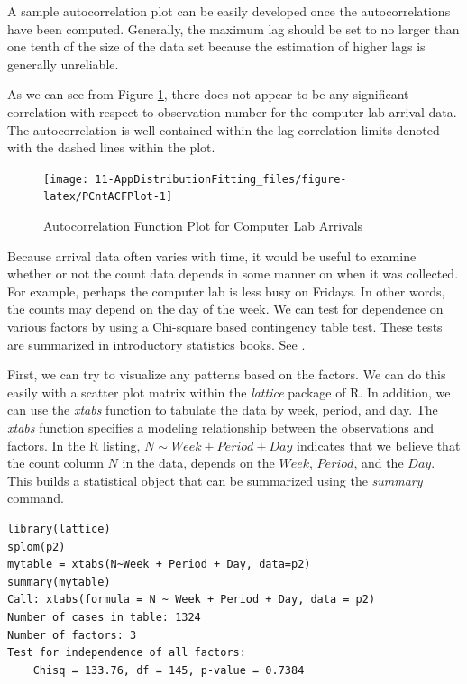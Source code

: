 \documentclass[
]{book}
\theoremstyle{definition}
\theoremstyle{definition}
\theoremstyle{definition}
\theoremstyle{definition}
\theoremstyle{remark}
\begin{document}
A sample autocorrelation plot can be easily developed once the
autocorrelations have been computed. Generally, the maximum lag should
be set to no larger than one tenth of the size of the data set because
the estimation of higher lags is generally unreliable.

As we can see from Figure \ref{fig:PCntACFPlot}, there does not appear to be any significant correlation with respect to observation number for the computer lab arrival data. The autocorrelation is well-contained within the lag correlation limits denoted with the dashed lines within the plot.

\begin{figure}

{\centering \texttt{[image: 11-AppDistributionFitting\_files/figure-latex/PCntACFPlot-1]} 

}

\caption{Autocorrelation Function Plot for Computer Lab Arrivals}\label{fig:PCntACFPlot}
\end{figure}

Because arrival data often varies with time, it would be useful to
examine whether or not the count data depends in some manner on when it
was collected. For example, perhaps the computer lab is less busy on
Fridays. In other words, the counts may depend on the day of the week.
We can test for dependence on various factors by using a Chi-square
based contingency table test. These tests are summarized in introductory
statistics books. See \citep{montgomery2006applied}.

First, we can try to visualize any patterns based on the factors. We can
do this easily with a scatter plot matrix within the \emph{lattice} package
of R. In addition, we can use the \emph{xtabs} function to tabulate the data
by week, period, and day. The \emph{xtabs} function specifies a modeling
relationship between the observations and factors. In the R listing,
\(N \sim Week + Period + Day\) indicates that we believe that the count
column \(N\) in the data, depends on the \(Week\), \(Period\), and the \(Day\).
This builds a statistical object that can be summarized using the
\emph{summary} command.

\begin{verbatim}
library(lattice)
splom(p2)
mytable = xtabs(N~Week + Period + Day, data=p2)
summary(mytable)
Call: xtabs(formula = N ~ Week + Period + Day, data = p2)
Number of cases in table: 1324 
Number of factors: 3 
Test for independence of all factors:
    Chisq = 133.76, df = 145, p-value = 0.7384
\end{verbatim}
\end{document}
